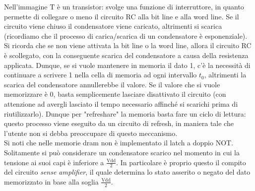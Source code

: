 \documentclass[class=book, crop=false, oneside]{standalone}
\begin{document}
Nell'immagine \(\textrm{T}\) è un transistor: svolge una funzione di interruttore, in quanto permette di collegare o meno il circuito RC alla bit line e alla word line. Se il circuito viene chiuso il condensatore viene caricato, altrimenti si scarica (ricordiamo che il processo di carica/scarica di un condensatore è esponenziale). Si ricorda che se non viene attivata la bit line o la word line, allora il circuito RC è scollegato, con la conseguente scarica del condensatore a causa della resistenza applicata. Dunque, se si vuole mantenere in memoria il dato 1, c'è la necessità di continuare a scrivere 1 nella cella di memoria ad ogni intervallo \(t_0\), altrimenti la scarica del condensatore annullerebbe il valore. Se il valore che si vuole memorizzare è 0, basta semplicemente lasciare disattivato il circuito (con attenzione ad avergli lasciato il tempo necessario affinché si scarichi prima di riutilizzarlo). Dunque per "refreshare" la memoria basta fare un ciclo di lettura: questo processo viene eseguito da un circuito di refresh, in maniera tale che l'utente non si debba preoccupare di questo meccanismo.\\
Si noti che nelle memorie \acrshort{dram} non è implementato il latch a doppio NOT.\\
Solitamente si può considerare un condensatore scarico nel momento in cui la tensione ai suoi capi è inferiore a \(\frac{\textrm{Vdd}}{2}\). In particolare è proprio questo il compito del circuito \emph{sense amplifier}, il quale determina lo stato asserito o negato del dato memorizzato in base alla soglia \(\frac{\textrm{Vdd}}{2}\).
\end{document}
